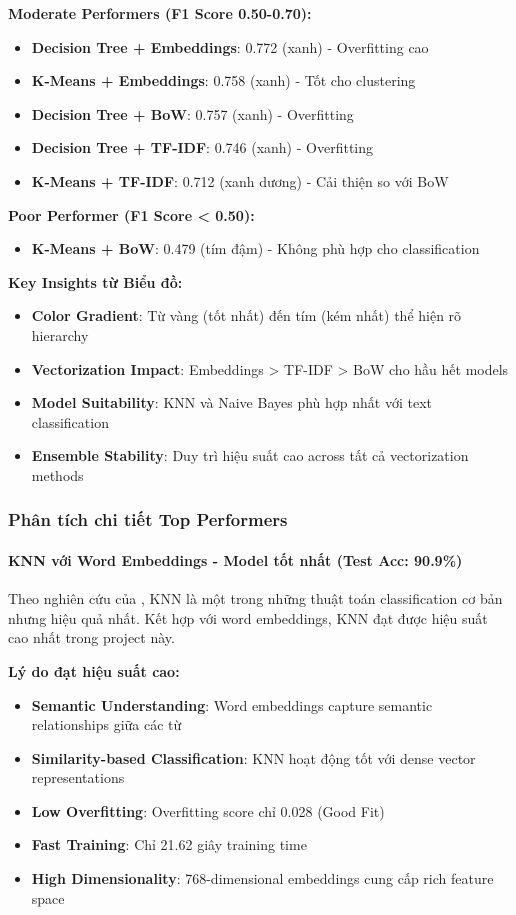 \textbf{Moderate Performers (F1 Score 0.50-0.70):}
\begin{itemize}
    \item \textbf{Decision Tree + Embeddings}: 0.772 (xanh) - Overfitting cao
    \item \textbf{K-Means + Embeddings}: 0.758 (xanh) - Tốt cho clustering
    \item \textbf{Decision Tree + BoW}: 0.757 (xanh) - Overfitting
    \item \textbf{Decision Tree + TF-IDF}: 0.746 (xanh) - Overfitting
    \item \textbf{K-Means + TF-IDF}: 0.712 (xanh dương) - Cải thiện so với BoW
\end{itemize}

\textbf{Poor Performer (F1 Score < 0.50):}
\begin{itemize}
    \item \textbf{K-Means + BoW}: 0.479 (tím đậm) - Không phù hợp cho classification
\end{itemize}

\textbf{Key Insights từ Biểu đồ:}
\begin{itemize}
    \item \textbf{Color Gradient}: Từ vàng (tốt nhất) đến tím (kém nhất) thể hiện rõ hierarchy
    \item \textbf{Vectorization Impact}: Embeddings > TF-IDF > BoW cho hầu hết models
    \item \textbf{Model Suitability}: KNN và Naive Bayes phù hợp nhất với text classification
    \item \textbf{Ensemble Stability}: Duy trì hiệu suất cao across tất cả vectorization methods
\end{itemize}

\subsubsection{Phân tích chi tiết Top Performers}

\paragraph{KNN với Word Embeddings - Model tốt nhất (Test Acc: 90.9\%)}

Theo nghiên cứu của \cite{cover1967}, KNN là một trong những thuật toán classification cơ bản nhưng hiệu quả nhất. Kết hợp với word embeddings, KNN đạt được hiệu suất cao nhất trong project này.

\textbf{Lý do đạt hiệu suất cao:}
\begin{itemize}
    \item \textbf{Semantic Understanding}: Word embeddings capture semantic relationships giữa các từ
    \item \textbf{Similarity-based Classification}: KNN hoạt động tốt với dense vector representations
    \item \textbf{Low Overfitting}: Overfitting score chỉ 0.028 (Good Fit)
    \item \textbf{Fast Training}: Chỉ 21.62 giây training time
    \item \textbf{High Dimensionality}: 768-dimensional embeddings cung cấp rich feature space
\end{itemize}


